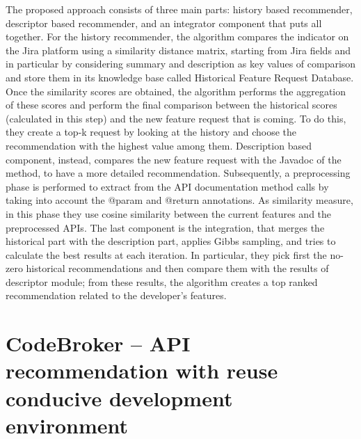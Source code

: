 The proposed approach consists of three main parts: history based recommender, 
descriptor based recommender, and an integrator component that puts all 
together. For the history recommender, the algorithm compares the indicator on 
the Jira platform using a similarity distance matrix, starting from Jira fields 
and in particular by considering summary and description as key values of 
comparison and store them in its knowledge base called Historical Feature 
Request Database. Once the similarity scores are obtained, the algorithm 
performs the aggregation of these scores and perform the final comparison 
between the historical scores (calculated in this step) and the new feature 
request that is coming. To do this, they create a top-k request by looking at 
the history and choose the recommendation with the highest value among them. 
Description based component, instead, compares the new feature request with the 
Javadoc of the method, to have a more detailed recommendation. Subsequently, a 
preprocessing phase is performed to extract from the API documentation method 
calls by taking into account the @param and @return annotations. As similarity 
measure, in this phase they use cosine similarity between the current features 
and the preprocessed APIs. The last component is the integration, that merges 
the historical part with the description part, applies Gibbs sampling, and 
tries to calculate the best results at each iteration. In particular, they pick 
first the no-zero historical recommendations and then compare them with the 
results of descriptor module; from these results, the algorithm creates a top 
ranked recommendation related to the developer's features. 



\section{CodeBroker -- API recommendation with reuse conducive development 
environment}

